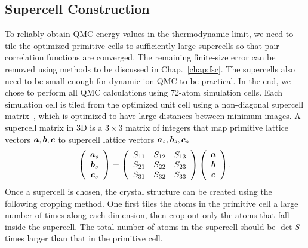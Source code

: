 \subsection{Supercell Construction}
To reliably obtain QMC energy values in the thermodynamic limit, we need to tile the optimized primitive cells to sufficiently large supercells so that pair correlation functions are converged.
The remaining finite-size error can be removed using methods to be discussed in Chap.~\ref{chap:fsc}.
The supercells also need to be small enough for dynamic-ion QMC to be practical.
In the end, we chose to perform all QMC calculations using 72-atom simulation cells. Each simulation cell is tiled from the optimized unit cell using a non-diagonal supercell matrix~\cite{Lloyd-Williams2015}, which is optimized to have large distances between minimum images.
A supercell matrix in 3D is a $3\times 3$ matrix of integers that map primitive lattice vectors $\boldsymbol{a}, \boldsymbol{b}, \boldsymbol{c}$ to supercell lattice vectors  $\boldsymbol{a}_s, \boldsymbol{b}_s, \boldsymbol{c}_s$
\begin{align}
\left(\begin{array}{c}
\boldsymbol{a}_s \\
\boldsymbol{b}_s \\
\boldsymbol{c}_s
\end{array}\right) =
\left(\begin{array}{ccc}
S_{11} & S_{12} & S_{13} \\
S_{21} & S_{22} & S_{23} \\
S_{31} & S_{32} & S_{33}
\end{array}\right)
\left(\begin{array}{c}
\boldsymbol{a} \\
\boldsymbol{b} \\
\boldsymbol{c}
\end{array}\right).
\end{align}
Once a supercell is chosen, the crystal structure can be created using the following cropping method. One first tiles the atoms in the primitive cell a large number of times along each dimension, then crop out only the atoms that fall inside the supercell.
The total number of atoms in the supercell should be $\det S$ times larger than that in the primitive cell.

